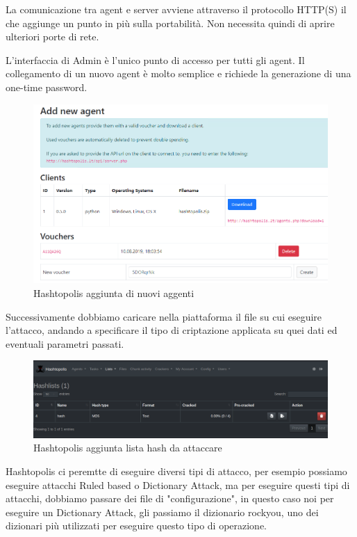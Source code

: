 La comunicazione tra agent e server avviene attraverso il protocollo HTTP(S) il che aggiunge un punto in più sulla portabilità. Non necessita quindi di aprire ulteriori porte di rete.

L’interfaccia di Admin è l’unico punto di accesso per tutti gli agent. Il collegamento di un nuovo agent è molto semplice e richiede la generazione di una one-time password. 

\begin{figure}[ht]
    \centering
    \includegraphics[width=\linewidth]{Immagini/8/hashtopolis_new_agent.png}
    \caption{Hashtopolis aggiunta di nuovi aggenti}
\end{figure}

Successivamente dobbiamo caricare nella piattaforma il file su cui eseguire l'attacco, andando a specificare il tipo di criptazione applicata su quei dati ed eventuali parametri passati.

\begin{figure}[ht]
    \centering
    \includegraphics[width=\linewidth]{Immagini/8/hashtopolis_2.png}
    \caption{Hashtopolis aggiunta lista hash da attaccare}
\end{figure}

Hashtopolis ci peremtte di eseguire diversi tipi di attacco, per esempio possiamo eseguire attacchi Ruled based o Dictionary Attack, ma per eseguire questi tipi di attacchi, dobbiamo passare dei file di "configurazione", in questo caso noi per eseguire un Dictionary Attack, gli passiamo il dizionario rockyou, uno dei dizionari più utilizzati per eseguire questo tipo di operazione.

